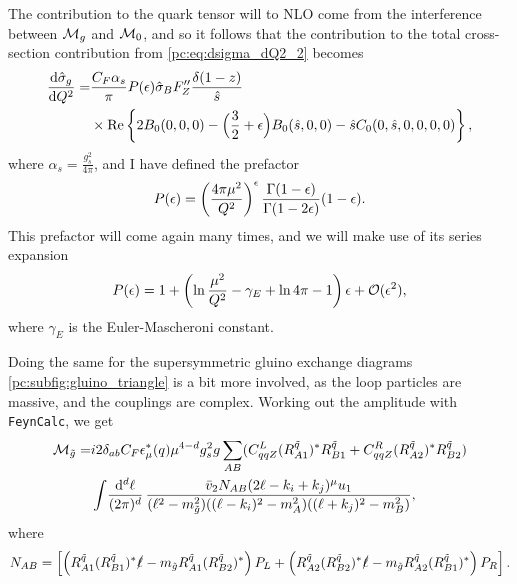 \documentclass[../main.tex]{subfiles}
\begin{document}
The contribution to the quark tensor will to NLO come from the interference between \(\mathcal{M}_g\) and \(\mathcal{M}_0\), and so it follows that the contribution to the total cross-section contribution from \cref{pc:eq:dsigma_dQ2_2} becomes
\begin{align}
  \nonumber
  \label{pc:eq:sigma_g_virtual}
  \d[Q^2]{\hat\sigma_g} = & \frac{C_F \alpha_s}{\pi} P(\epsilon) \hat\sigma_B F^{\prime\prime}_Z \frac{\delta(1-z)}{\hat{s}}             \\
                          & \times \Re{2B_0(0,0,0) - \Bigl(\frac{3}{2}+\epsilon\Bigr)B_0(\hat{s},0,0) - \hat{s} C_0(0,\hat{s},0,0,0,0)},
\end{align}
where \(\alpha_s = \frac{g_s^2}{4\pi}\), and I have defined the prefactor
\begin{equation}
  P(\epsilon) = \left(\frac{4\pi \mu^2}{Q^2}\right)^\epsilon \frac{\Gamma(1-\epsilon)}{\Gamma(1-2\epsilon)} (1-\epsilon).
\end{equation}
This prefactor will come again many times, and we will make use of its series expansion
\begin{equation}
  P(\epsilon) = 1 + \left(\ln\frac{\mu^2}{Q^2} - \gamma_E + \ln 4\pi - 1\right)\epsilon + \mathcal{O}(\epsilon^2),
\end{equation}
where \(\gamma_E\) is the Euler-Mascheroni constant.

Doing the same for the supersymmetric gluino exchange diagrams \cref{pc:subfig:gluino_triangle} is a bit more involved, as the loop particles are massive, and the couplings are complex.
Working out the amplitude with \verb|FeynCalc|, we get
\begin{align}
  \nonumber
  \M_{\tilde{g}} = & i2\delta_{ab} C_F \epsilon_\mu^\ast(q) \mu^{4-d} g_s^2 g \sum_{AB} (C_{qqZ}^L (R_{A1}^{\tilde{q}})^\ast R_{B1}^{\tilde{q}} + C_{qqZ}^R (R_{A2}^{\tilde{q}})^\ast R_{B2}^{\tilde{q}}) \\
                   & \loopintegral[d]{\ell} \frac{\bar{v}_2 N_{AB} (2\ell-k_i+k_j)\^\mu u_1}{(\ell^2-m_{\tilde{g}}^2) ((\ell-k_i)^2 - m_A^2)((\ell+k_j)^2 - m_B^2)},
\end{align}
where
\begin{equation}
  N_{AB} = \left[\left(R_{A1}^{\tilde{q}}(R_{B1}^{\tilde{q}})^\ast\slashed{\ell} - m_{\tilde{g}}R_{A1}^{\tilde{q}}(R_{B2}^{\tilde{q}})^\ast\right)P_L + \left(R_{A2}^{\tilde{q}}(R_{B2}^{\tilde{q}})^\ast\slashed{\ell} - m_{\tilde{g}}R_{A2}^{\tilde{q}}(R_{B1}^{\tilde{q}})^\ast\right)P_R\right].
\end{equation}
\end{document}
